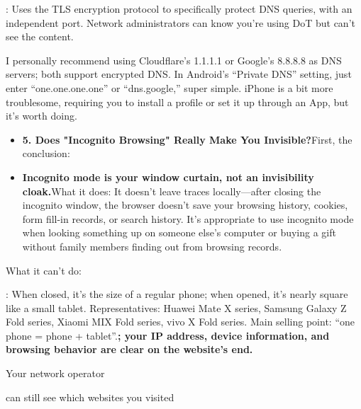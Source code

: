 : Uses the TLS encryption protocol to specifically protect DNS queries, with an independent port. Network administrators can know you're using DoT but can't see the content.

I personally recommend using Cloudflare's 1.1.1.1 or Google's 8.8.8.8 as DNS servers; both support encrypted DNS. In Android's “Private DNS” setting, just enter “one.one.one.one” or “dns.google,” super simple. iPhone is a bit more troublesome, requiring you to install a profile or set it up through an App, but it's worth doing.

\begin{itemize}
  \item \textbf{5. Does "Incognito Browsing" Really Make You Invisible?}First, the conclusion:
  \item \textbf{Incognito mode is your window curtain, not an invisibility cloak.}What it does: It doesn't leave traces locally—after closing the incognito window, the browser doesn't save your browsing history, cookies, form fill-in records, or search history. It's appropriate to use incognito mode when looking something up on someone else's computer or buying a gift without family members finding out from browsing records.
\end{itemize}

What it can't do:


: When closed, it's the size of a regular phone; when opened, it's nearly square like a small tablet. Representatives: Huawei Mate X series, Samsung Galaxy Z Fold series, Xiaomi MIX Fold series, vivo X Fold series. Main selling point: “one phone = phone + tablet”.\textbf{; your IP address, device information, and browsing behavior are clear on the website's end.}

Your network operator

can still see which websites you visited

